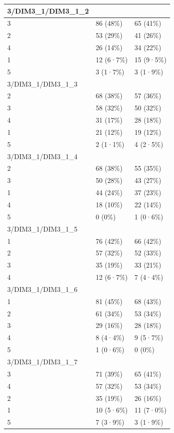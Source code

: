 \documentclass[
]{book}
\begin{document}
\begin{tabular}{l|l|l}
\hline
3/DIM3\_1/DIM3\_1\_2 &  & \\
\hline
3 & 86 (48\%) & 65 (41\%)\\
\hline
2 & 53 (29\%) & 41 (26\%)\\
\hline
4 & 26 (14\%) & 34 (22\%)\\
\hline
1 & 12 (6·7\%) & 15 (9·5\%)\\
\hline
5 & 3 (1·7\%) & 3 (1·9\%)\\
\hline
3/DIM3\_1/DIM3\_1\_3 &  & \\
\hline
2 & 68 (38\%) & 57 (36\%)\\
\hline
3 & 58 (32\%) & 50 (32\%)\\
\hline
4 & 31 (17\%) & 28 (18\%)\\
\hline
1 & 21 (12\%) & 19 (12\%)\\
\hline
5 & 2 (1·1\%) & 4 (2·5\%)\\
\hline
3/DIM3\_1/DIM3\_1\_4 &  & \\
\hline
2 & 68 (38\%) & 55 (35\%)\\
\hline
3 & 50 (28\%) & 43 (27\%)\\
\hline
1 & 44 (24\%) & 37 (23\%)\\
\hline
4 & 18 (10\%) & 22 (14\%)\\
\hline
5 & 0 (0\%) & 1 (0·6\%)\\
\hline
3/DIM3\_1/DIM3\_1\_5 &  & \\
\hline
1 & 76 (42\%) & 66 (42\%)\\
\hline
2 & 57 (32\%) & 52 (33\%)\\
\hline
3 & 35 (19\%) & 33 (21\%)\\
\hline
4 & 12 (6·7\%) & 7 (4·4\%)\\
\hline
3/DIM3\_1/DIM3\_1\_6 &  & \\
\hline
1 & 81 (45\%) & 68 (43\%)\\
\hline
2 & 61 (34\%) & 53 (34\%)\\
\hline
3 & 29 (16\%) & 28 (18\%)\\
\hline
4 & 8 (4·4\%) & 9 (5·7\%)\\
\hline
5 & 1 (0·6\%) & 0 (0\%)\\
\hline
3/DIM3\_1/DIM3\_1\_7 &  & \\
\hline
3 & 71 (39\%) & 65 (41\%)\\
\hline
4 & 57 (32\%) & 53 (34\%)\\
\hline
2 & 35 (19\%) & 26 (16\%)\\
\hline
1 & 10 (5·6\%) & 11 (7·0\%)\\
\hline
5 & 7 (3·9\%) & 3 (1·9\%)\\

\end{tabular}
\end{document}
